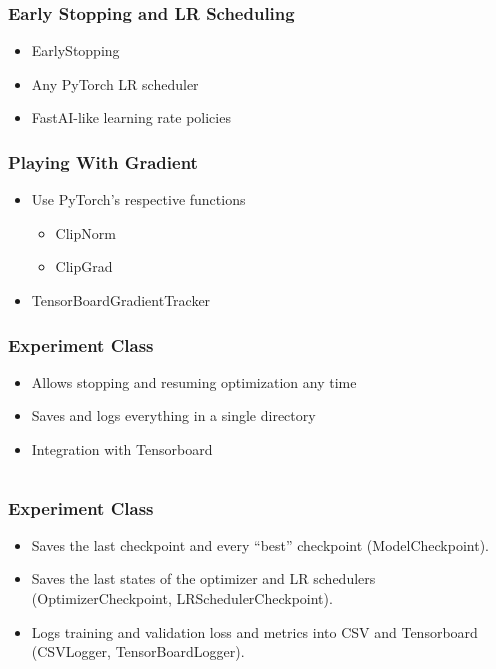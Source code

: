 \documentclass[french,english,usenames,dvipsnames]{beamer}
\begin{document}
    \begin{frame}
        \frametitle{Early Stopping and LR Scheduling}
        \begin{itemize}
            \item EarlyStopping
            \item Any PyTorch LR scheduler
            \item FastAI-like learning rate policies
        \end{itemize}
    \end{frame}

    \begin{frame}
        \frametitle{Playing With Gradient}
        \begin{itemize}
            \item Use PyTorch's respective functions
            \begin{itemize}
                \item ClipNorm
                \item ClipGrad
            \end{itemize}
            \item TensorBoardGradientTracker
        \end{itemize}
    \end{frame}



    \begin{frame}
        \frametitle{Experiment Class}
        \begin{itemize}
            \item Allows stopping and resuming optimization any time
            \item Saves and logs everything in a single directory
            \item Integration with Tensorboard \\[5mm]
            \inputminted[fontsize=\scriptsize]{python3}{code/example_experiment.py}
        \end{itemize}
    \end{frame}


    \begin{frame}
        \frametitle{Experiment Class}
        \begin{itemize}
            \item Saves the last checkpoint and every ``best'' checkpoint (ModelCheckpoint).
            \item Saves the last states of the optimizer and LR schedulers (OptimizerCheckpoint, LRSchedulerCheckpoint).
            \item Logs training and validation loss and metrics into CSV and Tensorboard (CSVLogger, TensorBoardLogger).
        \end{itemize}
    \end{frame}
\end{document}
